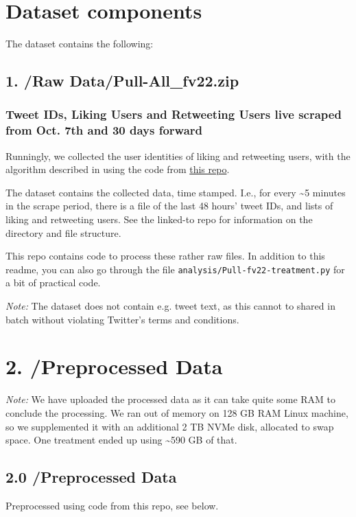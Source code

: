 \documentclass[10pt,english,sigconf,authoryear,nonacm]{article}
\begin{document}
\section*{Dataset components}

The dataset contains the following:

\subsection*{1. /Raw Data/Pull-All\_fv22.zip}

\subsubsection*{Tweet IDs, Liking Users and Retweeting Users live scraped from Oct.
7th and 30 days forward}

Runningly, we collected the user identities of liking and retweeting
users, with the algorithm described in \cite{JahnRendsvigTwitterLikesCIB}
using the code from \href{https://github.com/humanplayer2/get-twitter-likers-data}{this repo}.

The dataset contains the collected data, time stamped. I.e., for every
\textasciitilde 5 minutes in the scrape period, there is a file of
the last 48 hours' tweet IDs, and lists of liking and retweeting users.
See the linked-to repo for information on the directory and file structure.

This repo contains code to process these rather raw files. In addition
to this readme, you can also go through the file \texttt{analysis/Pull-fv22-treatment.py}
for a bit of practical code.\medskip{}

\emph{Note:} The dataset does not contain e.g. tweet text, as this
cannot to shared in batch without violating Twitter's terms and conditions.

\section*{2. /Preprocessed Data}

\emph{Note:} We have uploaded the processed data as it can take quite
some RAM to conclude the processing. We ran out of memory on 128 GB
RAM Linux machine, so we supplemented it with an additional 2 TB NVMe
disk, allocated to swap space. One treatment ended up using \textasciitilde 590
GB of that.

\subsection*{2.0 /Preprocessed Data}
Preprocessed using code from this repo, see below.
\end{document}
